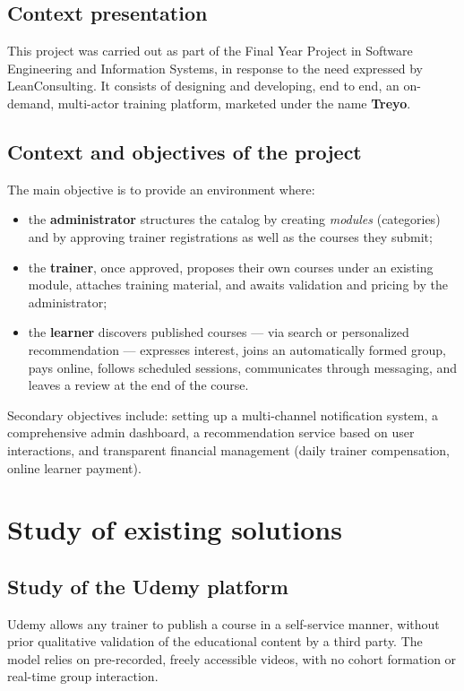 \documentclass[a4paper,12pt]{report}
\begin{document}
\subsection{Context presentation}
This project was carried out as part of the Final Year Project in Software
Engineering and Information Systems, in response to the need expressed by
LeanConsulting. It consists of designing and developing, end to end, an
on-demand, multi-actor training platform, marketed under the name
\textbf{Treyo}.

\subsection{Context and objectives of the project}
The main objective is to provide an environment where:
\begin{itemize}[leftmargin=*]
  \item the \textbf{administrator} structures the catalog by creating
        \emph{modules} (categories) and by approving trainer registrations
        as well as the courses they submit;
  \item the \textbf{trainer}, once approved, proposes their own courses
        under an existing module, attaches training material, and awaits
        validation and pricing by the administrator;
  \item the \textbf{learner} discovers published courses --- via search or
        personalized recommendation --- expresses interest, joins an
        automatically formed group, pays online, follows scheduled
        sessions, communicates through messaging, and leaves a review at
        the end of the course.
\end{itemize}

Secondary objectives include: setting up a multi-channel notification
system, a comprehensive admin dashboard, a recommendation service based on
user interactions, and transparent financial management (daily trainer
compensation, online learner payment).

\section{Study of existing solutions}

\subsection{Study of the Udemy platform}
Udemy allows any trainer to publish a course in a self-service manner,
without prior qualitative validation of the educational content by a third
party. The model relies on pre-recorded, freely accessible videos, with no
cohort formation or real-time group interaction.
\end{document}
